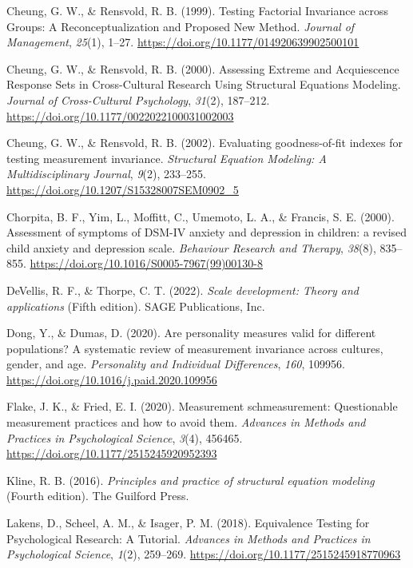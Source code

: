\documentclass[
  english,
  man]{apa7}
\newlength{\cslhangindent}
\newenvironment{CSLReferences}[2] %
 {\begin{list}{}{%
  \setlength{\itemindent}{0pt}
  \setlength{\leftmargin}{0pt}
  \setlength{\parsep}{0pt}
  \ifodd #1
   \setlength{\leftmargin}{\cslhangindent}
   \setlength{\itemindent}{-1\cslhangindent}
  \fi
  \setlength{\itemsep}{#2\baselineskip}}}
 {\end{list}}
\begin{document}
\begin{CSLReferences}{1}{0}
Cheung, G. W., \& Rensvold, R. B. (1999). Testing Factorial Invariance across Groups: A Reconceptualization and Proposed New Method. \emph{Journal of Management}, \emph{25}(1), 1--27. \url{https://doi.org/10.1177/014920639902500101}

Cheung, G. W., \& Rensvold, R. B. (2000). Assessing Extreme and Acquiescence Response Sets in Cross-Cultural Research Using Structural Equations Modeling. \emph{Journal of Cross-Cultural Psychology}, \emph{31}(2), 187--212. \url{https://doi.org/10.1177/0022022100031002003}

Cheung, G. W., \& Rensvold, R. B. (2002). Evaluating goodness-of-fit indexes for testing measurement invariance. \emph{Structural Equation Modeling: A Multidisciplinary Journal}, \emph{9}(2), 233--255. \url{https://doi.org/10.1207/S15328007SEM0902_5}

Chorpita, B. F., Yim, L., Moffitt, C., Umemoto, L. A., \& Francis, S. E. (2000). Assessment of symptoms of DSM-IV anxiety and depression in children: a revised child anxiety and depression scale. \emph{Behaviour Research and Therapy}, \emph{38}(8), 835--855. \url{https://doi.org/10.1016/S0005-7967(99)00130-8}

DeVellis, R. F., \& Thorpe, C. T. (2022). \emph{Scale development: Theory and applications} (Fifth edition). SAGE Publications, Inc.

Dong, Y., \& Dumas, D. (2020). Are personality measures valid for different populations? A systematic review of measurement invariance across cultures, gender, and age. \emph{Personality and Individual Differences}, \emph{160}, 109956. \url{https://doi.org/10.1016/j.paid.2020.109956}

Flake, J. K., \& Fried, E. I. (2020). Measurement schmeasurement: Questionable measurement practices and how to avoid them. \emph{Advances in Methods and Practices in Psychological Science}, \emph{3}(4), 456465. \url{https://doi.org/10.1177/2515245920952393}

Kline, R. B. (2016). \emph{Principles and practice of structural equation modeling} (Fourth edition). The Guilford Press.

Lakens, D., Scheel, A. M., \& Isager, P. M. (2018). Equivalence Testing for Psychological Research: A Tutorial. \emph{Advances in Methods and Practices in Psychological Science}, \emph{1}(2), 259--269. \url{https://doi.org/10.1177/2515245918770963}


\end{CSLReferences}
\end{document}
